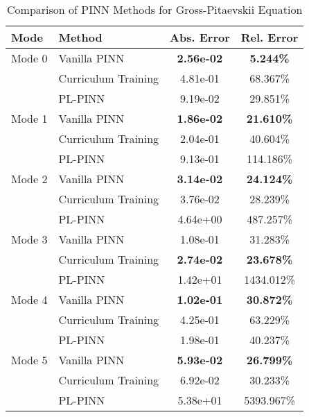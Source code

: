 \begin{table}[htbp]
\centering
\caption{Comparison of PINN Methods for Gross-Pitaevskii Equation}
\label{tab:pinn_comparison}
\begin{tabular}{llcc}
\toprule
Mode & Method & Abs. Error & Rel. Error \\
\midrule
Mode 0 & Vanilla PINN & \textbf{2.56e-02} & \textbf{5.244\%} \\
 & Curriculum Training & 4.81e-01 & 68.367\% \\
 & PL-PINN & 9.19e-02 & 29.851\% \\
\midrule
Mode 1 & Vanilla PINN & \textbf{1.86e-02} & \textbf{21.610\%} \\
 & Curriculum Training & 2.04e-01 & 40.604\% \\
 & PL-PINN & 9.13e-01 & 114.186\% \\
\midrule
Mode 2 & Vanilla PINN & \textbf{3.14e-02} & \textbf{24.124\%} \\
 & Curriculum Training & 3.76e-02 & 28.239\% \\
 & PL-PINN & 4.64e+00 & 487.257\% \\
\midrule
Mode 3 & Vanilla PINN & 1.08e-01 & 31.283\% \\
 & Curriculum Training & \textbf{2.74e-02} & \textbf{23.678\%} \\
 & PL-PINN & 1.42e+01 & 1434.012\% \\
\midrule
Mode 4 & Vanilla PINN & \textbf{1.02e-01} & \textbf{30.872\%} \\
 & Curriculum Training & 4.25e-01 & 63.229\% \\
 & PL-PINN & 1.98e-01 & 40.237\% \\
\midrule
Mode 5 & Vanilla PINN & \textbf{5.93e-02} & \textbf{26.799\%} \\
 & Curriculum Training & 6.92e-02 & 30.233\% \\
 & PL-PINN & 5.38e+01 & 5393.967\% \\
\bottomrule
\end{tabular}
\end{table}